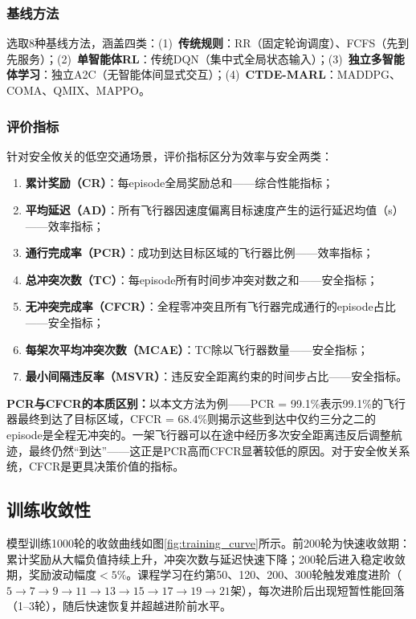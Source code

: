 \documentclass[12pt,a4paper,UTF8]{ctexart}
\begin{document}
\subsubsection{基线方法}

选取8种基线方法，涵盖四类：(1)~\textbf{传统规则}：RR（固定轮询调度）、FCFS（先到先服务）；(2)~\textbf{单智能体RL}：传统DQN（集中式全局状态输入）；(3)~\textbf{独立多智能体学习}：独立A2C（无智能体间显式交互）；(4)~\textbf{CTDE-MARL}：MADDPG、COMA、QMIX、MAPPO。

\subsubsection{评价指标}

针对安全攸关的低空交通场景，评价指标区分为效率与安全两类：
\begin{enumerate}[label=(\arabic*)]
    \item \textbf{累计奖励（CR）}：每episode全局奖励总和——综合性能指标；
    \item \textbf{平均延迟（AD）}：所有飞行器因速度偏离目标速度产生的运行延迟均值（s）——效率指标；
    \item \textbf{通行完成率（PCR）}：成功到达目标区域的飞行器比例——效率指标；
    \item \textbf{总冲突次数（TC）}：每episode所有时间步冲突对数之和——安全指标；
    \item \textbf{无冲突完成率（CFCR）}：全程零冲突且所有飞行器完成通行的episode占比——安全指标；
    \item \textbf{每架次平均冲突次数（MCAE）}：TC除以飞行器数量——安全指标；
    \item \textbf{最小间隔违反率（MSVR）}：违反安全距离约束的时间步占比——安全指标。
\end{enumerate}

\textbf{PCR与CFCR的本质区别：}以本文方法为例——PCR = 99.1\%表示99.1\%的飞行器最终到达了目标区域，CFCR = 68.4\%则揭示这些到达中仅约三分之二的episode是全程无冲突的。一架飞行器可以在途中经历多次安全距离违反后调整航迹，最终仍然``到达''——这正是PCR高而CFCR显著较低的原因。对于安全攸关系统，CFCR是更具决策价值的指标。

\subsection{训练收敛性}

模型训练1000轮的收敛曲线如图\ref{fig:training_curve}所示。前200轮为快速收敛期：累计奖励从大幅负值持续上升，冲突次数与延迟快速下降；200轮后进入稳定收敛期，奖励波动幅度$<5\%$。课程学习在约第50、120、200、300轮触发难度进阶（$5\to7\to9\to11\to13\to15\to17\to19\to21$架），每次进阶后出现短暂性能回落（1--3轮），随后快速恢复并超越进阶前水平。
\end{document}
